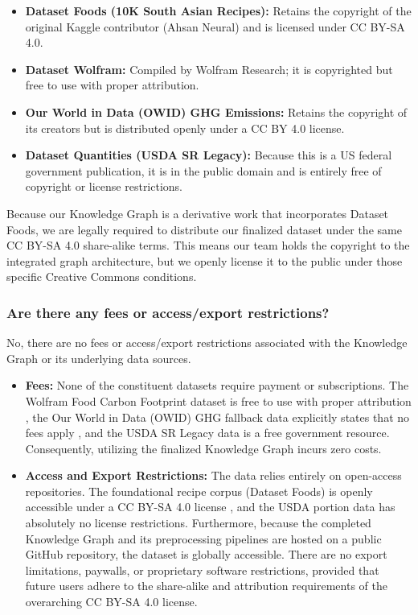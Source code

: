 \documentclass{article}
\newcommand{\question}[1]{#1}
\begin{document}
\begin{itemize}
    \item \textbf{Dataset Foods (10K South Asian Recipes):} Retains the copyright of the original Kaggle contributor (Ahsan Neural) and is licensed under CC BY-SA 4.0. 
    \item \textbf{Dataset Wolfram:} Compiled by Wolfram Research; it is copyrighted but free to use with proper attribution. 
    \item \textbf{Our World in Data (OWID) GHG Emissions:} Retains the copyright of its creators but is distributed openly under a CC BY 4.0 license. 
    \item \textbf{Dataset Quantities (USDA SR Legacy):} Because this is a US federal government publication, it is in the public domain and is entirely free of copyright or license restrictions. 
\end{itemize}
Because our Knowledge Graph is a derivative work that incorporates Dataset Foods, we are legally required to distribute our finalized dataset under the same CC BY-SA 4.0 share-alike terms. This means our team holds the copyright to the integrated graph architecture, but we openly license it to the public under those specific Creative Commons conditions. 




\question{\subsubsection*{Are there any fees or access/export restrictions?}}

No, there are no fees or access/export restrictions associated with the Knowledge Graph or its underlying data sources.

\begin{itemize}
    \item \textbf{Fees:} None of the constituent datasets require payment or subscriptions. The Wolfram Food Carbon Footprint dataset is free to use with proper attribution , the Our World in Data (OWID) GHG fallback data explicitly states that no fees apply , and the USDA SR Legacy data is a free government resource. Consequently, utilizing the finalized Knowledge Graph incurs zero costs. 
    \item \textbf{Access and Export Restrictions:} The data relies entirely on open-access repositories. The foundational recipe corpus (Dataset Foods) is openly accessible under a CC BY-SA 4.0 license , and the USDA portion data has absolutely no license restrictions. Furthermore, because the completed Knowledge Graph and its preprocessing pipelines are hosted on a public GitHub repository, the dataset is globally accessible. There are no export limitations, paywalls, or proprietary software restrictions, provided that future users adhere to the share-alike and attribution requirements of the overarching CC BY-SA 4.0 license. 
\end{itemize}
\end{document}
